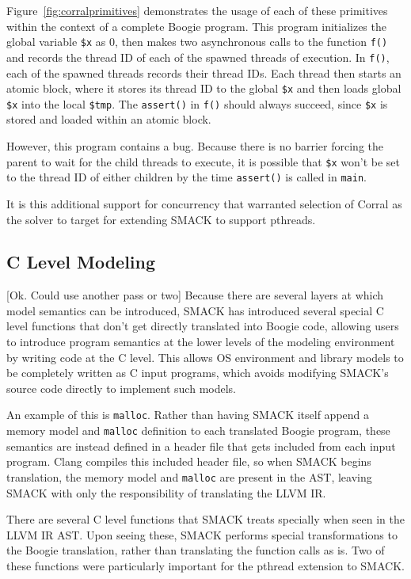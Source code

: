Figure~\ref{fig:corralprimitives} demonstrates the usage of each of
these primitives within the context of a complete Boogie program.
This program initializes the global variable \lstinline|$x| as 0, then
makes two asynchronous calls to the function \lstinline|f()| and
records the thread ID of each of the spawned threads of execution.  In
\lstinline|f()|, each of the spawned threads records their thread IDs.
Each thread then starts an atomic block, where it stores its thread ID
to the global \lstinline|$x| and then loads global \lstinline|$x| into
the local \lstinline|$tmp|.  The \lstinline|assert()| in
\lstinline|f()| should always succeed, since \lstinline|$x| is stored
and loaded within an atomic block. 

However, this program contains a bug.  Because there is no barrier
forcing the parent to wait for the child threads to execute, it is
possible that \lstinline|$x| won't be set to the thread ID of either
children by the time \lstinline|assert()| is called in
\lstinline|main|.

It is this additional support for concurrency that warranted selection
of Corral as the solver to target for extending SMACK to support pthreads.

\subsection{C Level Modeling}
[Ok.  Could use another pass or two]
Because there are several layers at which model semantics can be
introduced, SMACK has introduced several special C level functions 
that don't get directly translated into Boogie code, allowing users to
introduce program semantics at the lower levels of the modeling
environment by writing code at the C level.  This allows OS
environment and library models to be completely written as C input
programs, which avoids modifying SMACK's source code directly to
implement such models.

An example of this is \lstinline|malloc|.  Rather than having SMACK
itself append a memory model and \lstinline|malloc| definition to each
translated Boogie program, these semantics are instead defined in a
header file that gets included from each input program.  Clang
compiles this included header file, so when SMACK begins translation,
the memory model and \lstinline|malloc| are present in the AST,
leaving SMACK with only the responsibility of translating the LLVM IR.

There are several C level functions that SMACK treats specially when
seen in the LLVM IR AST.  Upon seeing these, SMACK performs special
transformations to the Boogie translation, rather than translating the
function calls as is.  Two of these functions were particularly
important for the pthread extension to SMACK. 


